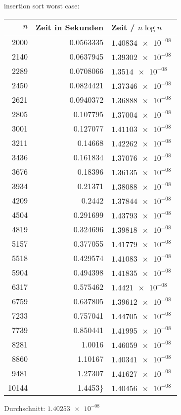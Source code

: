 \documentclass[a4paper]{scrartcl}
\begin{document}
\begin{itemize}
insertion sort worst case:
\begin{center}
\begin{tabular}{rrl}
$n$ & Zeit in Sekunden & Zeit / $n\log n$\\
\hline
2000 & 0.0563335 & $\SI{1.40834e-08}{}$\\
2140 & 0.0637945 & $\SI{1.39302e-08}{}$\\
2289 & 0.0708066 & $\SI{1.3514e-08}{}$\\
2450 & 0.0824421 & $\SI{1.37346e-08}{}$\\
2621 & 0.0940372 & $\SI{1.36888e-08}{}$\\
2805 & 0.107795 & $\SI{1.37004e-08}{}$\\
3001 & 0.127077 & $\SI{1.41103e-08}{}$\\
3211 & 0.14668 & $\SI{1.42262e-08}{}$\\
3436 & 0.161834 & $\SI{1.37076e-08}{}$\\
3676 & 0.18396 & $\SI{1.36135e-08}{}$\\
3934 & 0.21371 & $\SI{1.38088e-08}{}$\\
4209 & 0.2442 & $\SI{1.37844e-08}{}$\\
4504 & 0.291699 & $\SI{1.43793e-08}{}$\\
4819 & 0.324696 & $\SI{1.39818e-08}{}$\\
5157 & 0.377055 & $\SI{1.41779e-08}{}$\\
5518 & 0.429574 & $\SI{1.41083e-08}{}$\\
5904 & 0.494398 & $\SI{1.41835e-08}{}$\\
6317 & 0.575462 & $\SI{1.4421e-08}{}$\\
6759 & 0.637805 & $\SI{1.39612e-08}{}$\\
7233 & 0.757041 & $\SI{1.44705e-08}{}$\\
7739 & 0.850441 & $\SI{1.41995e-08}{}$\\
8281 & 1.0016 & $\SI{1.46059e-08}{}$\\
8860 & 1.10167 & $\SI{1.40341e-08}{}$\\
9481 & 1.27307 & $\SI{1.41627e-08}{}$\\
10144 & 1.4453\} & $\SI{1.40456e-08}{}$\\
\end{tabular}
\end{center}
Durchschnitt: $\SI{1.40253e-08}{}$


\end{itemize}
\end{document}
